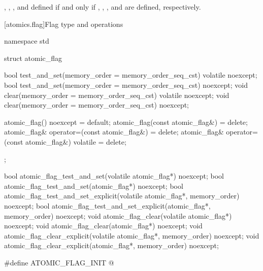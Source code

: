 %
%
%
%
%
%
%
%
%
%
%
%
%
%
%
%
%
%
%
%
%
%
%
%
%
%
%
%
%
%
\pnum
{}
 , ,
, and 
  defined if and only if
, ,
, and 
are defined, respectively.


[atomics.flag]{Flag type and operations}

\begin{codeblock}
namespace std {
  struct atomic_flag {
    bool test_and_set(memory_order = memory_order_seq_cst) volatile noexcept;
    bool test_and_set(memory_order = memory_order_seq_cst) noexcept;
    void clear(memory_order = memory_order_seq_cst) volatile noexcept;
    void clear(memory_order = memory_order_seq_cst) noexcept;

    atomic_flag() noexcept = default;
    atomic_flag(const atomic_flag&) = delete;
    atomic_flag& operator=(const atomic_flag&) = delete;
    atomic_flag& operator=(const atomic_flag&) volatile = delete;
  };

  bool atomic_flag_test_and_set(volatile atomic_flag*) noexcept;
  bool atomic_flag_test_and_set(atomic_flag*) noexcept;
  bool atomic_flag_test_and_set_explicit(volatile atomic_flag*, memory_order) noexcept;
  bool atomic_flag_test_and_set_explicit(atomic_flag*, memory_order) noexcept;
  void atomic_flag_clear(volatile atomic_flag*) noexcept;
  void atomic_flag_clear(atomic_flag*) noexcept;
  void atomic_flag_clear_explicit(volatile atomic_flag*, memory_order) noexcept;
  void atomic_flag_clear_explicit(atomic_flag*, memory_order) noexcept;

  #define ATOMIC_FLAG_INIT @\seebelow@
}
\end{codeblock}

